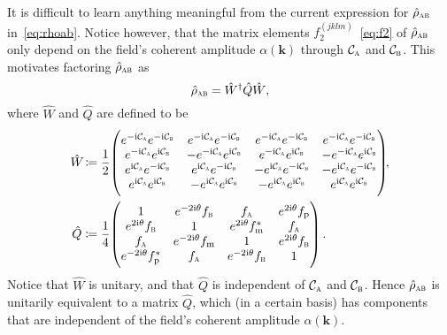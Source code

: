 \documentclass[pra,nofootinbib,floats,aps,twocolumn,tightenlines,superscriptaddress]{revtex4-1}
\newcommand{\ii}{\mathrm{i}}
\newcommand{\rhoab}{\hat{\rho}_\textsc{ab}}
\newcommand{\ca}{\mathcal{C}_\textsc{a}}
\newcommand{\cb}{\mathcal{C}_\textsc{b}}
\newcommand{\fa}{f_\textsc{a}}
\newcommand{\fb}{f_\textsc{b}}
\newcommand{\fp}{f_\text{p}}
\newcommand{\fm}{f_\text{m}}
\begin{document}
It is difficult to learn anything meaningful from the current expression for $\rhoab$ in~\eqref{eq:rhoab}. Notice however, that the matrix elements $f_2^{(jklm)}$~\eqref{eq:f2} of $\rhoab$ only depend on the field's coherent amplitude $\alpha(\bm k)$ through $\ca$ and $\cb$. This motivates factoring $\rhoab$ as
\begin{equation}
\label{eq:rho_ab_fact}
    \rhoab
    =
    \hat{W}^\dagger \hat{Q} \hat{W},
\end{equation}
where $\hat{W}$ and $\hat{Q}$ are defined to be
\begin{align}
\label{eq:W}
    \hat{W}\!
    &\coloneqq
    \frac{1}{2}\!
    \begin{pmatrix}
    e^{-\ii\ca}e^{-\ii\cb} &
    e^{-\ii\ca}e^{-\ii\cb} &
    e^{-\ii\ca}e^{-\ii\cb} &
    e^{-\ii\ca}e^{-\ii\cb} 
    \\
    e^{-\ii\ca}e^{\ii\cb} &
    -e^{-\ii\ca}e^{\ii\cb} &
    e^{-\ii\ca}e^{\ii\cb} &
    -e^{-\ii\ca}e^{\ii\cb} 
    \\
    e^{\ii\ca}e^{-\ii\cb} &
    e^{\ii\ca}e^{-\ii\cb} &
    -e^{\ii\ca}e^{-\ii\cb} &
    -e^{\ii\ca}e^{-\ii\cb} 
    \\
    e^{\ii\ca}e^{\ii\cb} &
    -e^{\ii\ca}e^{\ii\cb} &
    -e^{\ii\ca}e^{\ii\cb} &
    e^{\ii\ca}e^{\ii\cb}
    \end{pmatrix}\!\!,
    \\
\label{eq:Q}
    \hat{Q}
    &\coloneqq
    \frac{1}{4}\!
    \begin{pmatrix}
    1 & e^{-2\ii\theta} \fb & \fa & e^{2\ii\theta} \fp
    \\
    e^{2\ii\theta} \fb & 1 & e^{2\ii\theta} \fm^* & \fa
    \\
    \fa & e^{-2\ii\theta} \fm & 1 & e^{2\ii\theta} \fb
    \\
    e^{-2\ii\theta} \fp^* & \fa & e^{-2\ii\theta} \fb & 1
    \end{pmatrix}.
\end{align}
Notice that $\hat{W}$ is unitary, and that $\hat{Q}$ is independent of $\ca$ and $\cb$. Hence $\rhoab$ is unitarily equivalent to a matrix $\hat{Q}$, which (in a certain basis) has components that are independent of the field's coherent amplitude $\alpha(\bm k)$.
\end{document}
